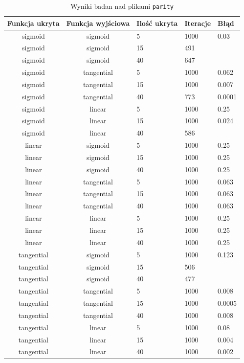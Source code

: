 \documentclass[pointlessnumbers, abstracton, headsepline, a4paper]{scrartcl}
\begin{document}
\begin{table}[h]
\centering
\begin{tabular}[t]{c|c|l|l|l}
Funkcja ukryta & Funkcja wyjściowa & Ilość ukryta & Iteracje & Błąd \\
\hline
sigmoid & sigmoid & 5 & 1000 & 0.03 \\
sigmoid & sigmoid & 15 & 491 & \\
sigmoid & sigmoid & 40 & 647 & \\
sigmoid & tangential & 5 & 1000 & 0.062 \\
sigmoid & tangential & 15 & 1000 & 0.007 \\
sigmoid & tangential & 40 & 773 & 0.0001 \\
sigmoid & linear & 5 & 1000 & 0.25 \\
sigmoid & linear & 15 & 1000 & 0.024 \\
sigmoid & linear & 40 & 586 & \\
linear & sigmoid & 5 & 1000 & 0.25 \\
linear & sigmoid & 15 & 1000 & 0.25 \\
linear & sigmoid & 40 & 1000 & 0.25 \\
linear & tangential & 5 & 1000 & 0.063 \\
linear & tangential & 15 & 1000 & 0.063 \\
linear & tangential & 40 & 1000 & 0.063 \\
linear & linear & 5 & 1000 & 0.25 \\
linear & linear & 15 & 1000 & 0.25 \\
linear & linear & 40 & 1000 & 0.25 \\
tangential & sigmoid & 5 & 1000 & 0.123 \\
tangential & sigmoid & 15 & 506 & \\
tangential & sigmoid & 40 & 477 & \\
tangential & tangential & 5 & 1000 & 0.008 \\
tangential & tangential & 15 & 1000 & 0.0005 \\
tangential & tangential & 40 & 1000 & 0.008 \\
tangential & linear & 5 & 1000 & 0.08 \\
tangential & linear & 15 & 1000 & 0.004 \\
tangential & linear & 40 & 1000 & 0.002 \\
\end{tabular}
\caption{\label{tab:parity}Wyniki badan nad plikami \texttt{parity}}
\end{table}
\end{document}
